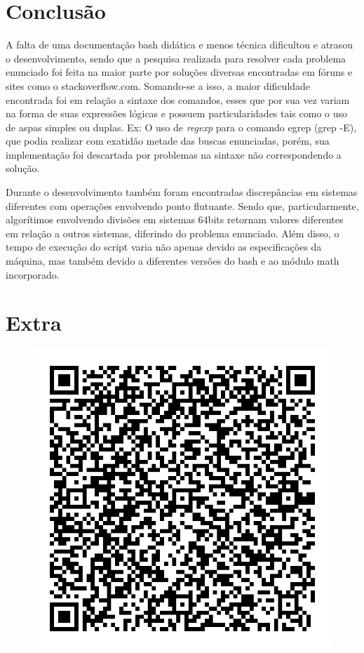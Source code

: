 \documentclass[12pt]{article}
\begin{document}
\pagebreak

\section{Conclusão}

A falta de uma documentação bash didática e menos técnica dificultou e atrasou o desenvolvimento, sendo que a pesquisa realizada para resolver cada problema enunciado  foi feita na maior parte por soluções diversas encontradas em fóruns e sites como o stackoverflow.com. Somando-se a isso, a maior dificuldade encontrada foi em relação a sintaxe dos comandos, esses que por sua vez variam na forma de suas expressões lógicas e possuem particularidades tais como o uso de aspas simples ou duplas. Ex: O uso de \textit{regexp} para o comando egrep (grep -E), que podia realizar com exatidão metade das buscas enunciadas, porém, sua implementação foi descartada por problemas na sintaxe não correspondendo a solução.

Durante o desenvolvimento também foram encontradas discrepâncias em sistemas diferentes com operações envolvendo ponto flutuante. Sendo que, particularmente, algorítimos envolvendo divisões em sistemas 64bits retornam valores diferentes em relação a outros sistemas, diferindo do problema enunciado. Além disso, o tempo de execução do script varia não apenas devido as especificações da máquina, mas também devido a diferentes versões do bash e ao módulo math incorporado.

\pagebreak

\section{Extra}

\begin{figure}[h]
    \centering
    \includegraphics[scale=0.3]{imagens/extra.jpg}
\end{figure}
\end{document}
